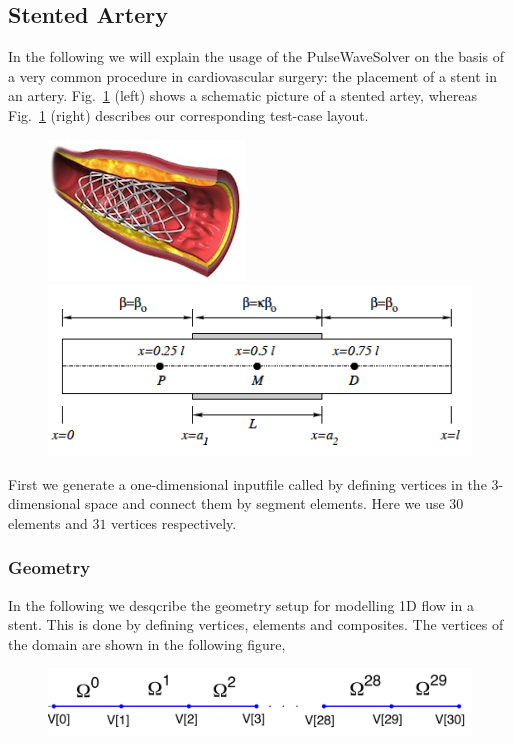 \subsection{Stented Artery}
In the following we will explain the usage of the PulseWaveSolver on the basis
of a very common procedure in cardiovascular surgery: the placement of a stent
in an artery. Fig.~\ref{f:pulsewave:stent} (left) shows a schematic picture of a
stented artey, whereas Fig.~\ref{f:pulsewave:stent} (right) describes our
corresponding test-case layout.
\begin{figure}
	\includegraphics[width=0.35\linewidth]{Figures/stent_2.jpg}
	\includegraphics[width=0.6\linewidth]{Figures/P_M_D.png}
	\caption{}
	\label{f:pulsewave:stent}
\end{figure}
First we generate a one-dimensional inputfile called  by
defining vertices in the 3-dimensional space and connect them by segment elements. Here
we use $30$ elements and $31$ vertices respectively.

\subsubsection{Geometry}
In the following we desqcribe the geometry setup for modelling 1D flow in a
stent. This is done by defining vertices, elements and composites. The vertices
of the domain are shown in the following figure,

\begin{figure}
	\centering
	\includegraphics[width=\linewidth]{Figures/Domain.png}
\end{figure}

